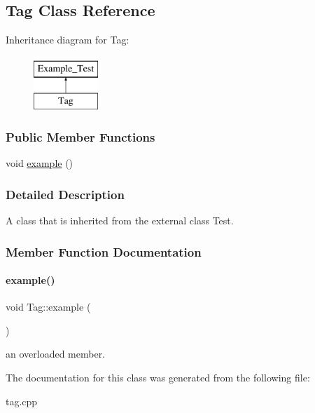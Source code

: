 \hypertarget{class_tag}{}\subsection{Tag Class Reference}
\label{class_tag}
Inheritance diagram for Tag\+:\begin{figure}[H]
\begin{center}
\leavevmode
\includegraphics[height=2.000000cm]{class_tag}
\end{center}
\end{figure}
\subsubsection*{Public Member Functions}
\begin{DoxyCompactItemize}
\item 
void \mbox{\hyperlink{class_tag_acc641ffae34e2c4c03a6edf0a513be28}{example}} ()
\end{DoxyCompactItemize}


\subsubsection{Detailed Description}
A class that is inherited from the external class Test. 

\subsubsection{Member Function Documentation}
\mbox{\label{class_tag_acc641ffae34e2c4c03a6edf0a513be28}} 
\paragraph{\texorpdfstring{example()}{example()}}
{\footnotesize\ttfamily void Tag\+::example (\begin{DoxyParamCaption}{ }\end{DoxyParamCaption})}

an overloaded member. 

The documentation for this class was generated from the following file\+:\begin{DoxyCompactItemize}
\item 
tag.\+cpp\end{DoxyCompactItemize}
